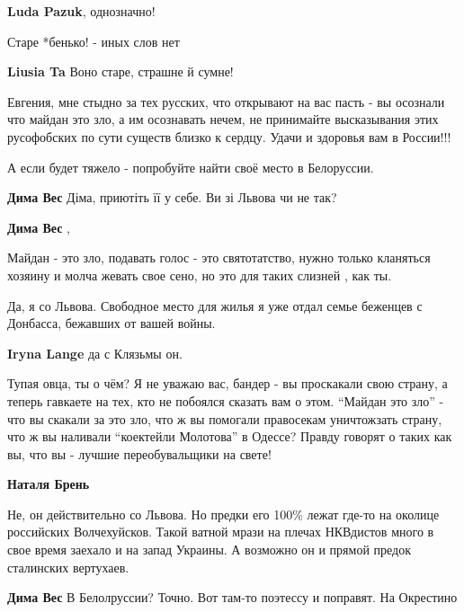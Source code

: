 \begin{itemize}
\begin{itemize}
\textbf{Luda Pazuk}, однозначно!
\end{itemize} %

Старе *бенько! - иных слов нет

\textbf{Liusia Ta} Воно старе, страшне й сумне!


Евгения, мне стыдно за тех русских, что открывают на вас пасть - вы осознали
что майдан это зло, а им осознавать нечем, не принимайте высказывания этих
русофобских по сути существ близко к сердцу. Удачи и здоровья вам в России!!!

А если будет тяжело - попробуйте найти своё место в Белоруссии.

\begin{itemize} %
\textbf{Дима Вес} Діма, приютіть її у себе. Ви зі Львова чи не так?

\textbf{Дима Вес} , 

Майдан - это зло, подавать голос - это святотатство, нужно только кланяться
хозяину и молча жевать свое сено, но это для таких слизней , как ты.


Да, я со Львова. Свободное место для жилья я уже отдал семье беженцев с
Донбасса, бежавших от вашей войны.

\textbf{Iryna Lange} да с Клязьмы он.


Тупая овца, ты о чём? Я не уважаю вас, бандер - вы проскакали свою страну, а
теперь гавкаете на тех, кто не побоялся сказать вам о этом. \enquote{Майдан это зло} -
что вы скакали за это зло, что ж вы помогали правосекам уничтожзать страну, что
ж вы наливали \enquote{коектейли Молотова} в Одессе? Правду говорят о таких как вы, что
вы - лучшие переобувальщики на свете!

\textbf{Наталя Брень} 

Не, он действительно со Львова. Но предки его 100\% лежат где-то на околице
российских Волчехуйсков. Такой ватной мрази на плечах НКВдистов много в свое
время заехало и на запад Украины. А возможно он и прямой предок сталинских
вертухаев.

\textbf{Дима Вес} В Белолруссии? Точно. Вот там-то поэтессу и поправят. На Окрестино
\end{itemize} %



\end{itemize}
